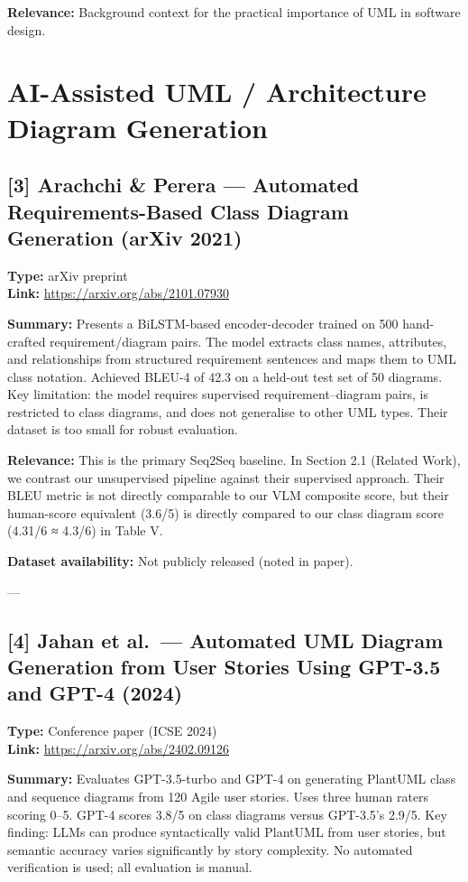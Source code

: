 \documentclass[11pt]{article}
\begin{document}
\textbf{Relevance:} Background context for the practical importance of UML in software design.

\section{AI-Assisted UML / Architecture Diagram Generation}

\subsection*{[3] Arachchi \& Perera — Automated Requirements-Based Class Diagram Generation (arXiv 2021)}
\textbf{Type:} arXiv preprint \\
\textbf{Link:} \url{https://arxiv.org/abs/2101.07930}

\textbf{Summary:} Presents a BiLSTM-based encoder-decoder trained on 500 hand-crafted requirement/diagram pairs. The model extracts class names, attributes, and relationships from structured requirement sentences and maps them to UML class notation. Achieved BLEU-4 of 42.3 on a held-out test set of 50 diagrams. Key limitation: the model requires supervised requirement–diagram pairs, is restricted to class diagrams, and does not generalise to other UML types. Their dataset is too small for robust evaluation.

\textbf{Relevance:} This is the primary Seq2Seq baseline. In Section 2.1 (Related Work), we contrast our unsupervised pipeline against their supervised approach. Their BLEU metric is not directly comparable to our VLM composite score, but their human-score equivalent (3.6/5) is directly compared to our class diagram score (4.31/6 ≈ 4.3/6) in Table V.

\textbf{Dataset availability:} Not publicly released (noted in paper).

---

\subsection*{[4] Jahan et al.\ — Automated UML Diagram Generation from User Stories Using GPT-3.5 and GPT-4 (2024)}
\textbf{Type:} Conference paper (ICSE 2024) \\
\textbf{Link:} \url{https://arxiv.org/abs/2402.09126}

\textbf{Summary:} Evaluates GPT-3.5-turbo and GPT-4 on generating PlantUML class and sequence diagrams from 120 Agile user stories. Uses three human raters scoring 0–5. GPT-4 scores 3.8/5 on class diagrams versus GPT-3.5's 2.9/5. Key finding: LLMs can produce syntactically valid PlantUML from user stories, but semantic accuracy varies significantly by story complexity. No automated verification is used; all evaluation is manual.
\end{document}
